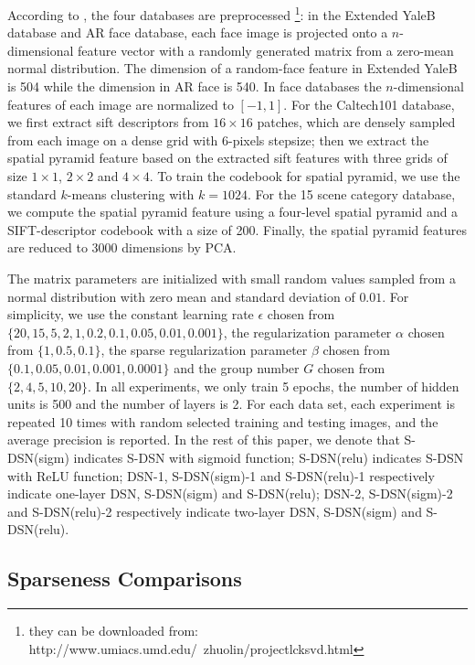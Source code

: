 \documentclass[letterpaper]{article}
\begin{document}
According to \cite{Jiang2013}, the four databases are preprocessed \footnote{they can be downloaded from: http://www.umiacs.umd.edu/~zhuolin/projectlcksvd.html}: in the Extended YaleB database and AR face database, each face image is projected onto a $n$-dimensional feature vector with a randomly generated matrix from a zero-mean normal distribution. The dimension of a random-face feature in Extended YaleB is 504 while the dimension in AR face is 540. In face databases the $n$-dimensional features of each image are normalized to $[-1,1]$. For the Caltech101 database, we first extract sift descriptors from $16\times16$ patches, which are densely sampled from each image on a dense grid with 6-pixels stepsize; then we extract the spatial pyramid feature based on the extracted sift features with three grids of size $1\times1$, $2\times2$ and $4\times4$. To train the codebook for spatial pyramid, we use the standard $k$-means clustering with $k = 1024$. For the 15 scene category database, we compute the spatial pyramid feature using a four-level spatial pyramid and a SIFT-descriptor codebook with a size of 200. Finally, the spatial pyramid features are reduced to 3000 dimensions by PCA.

The matrix parameters are initialized with small random values sampled from a normal distribution with zero mean and standard deviation of $0.01$. For simplicity, we use the constant learning rate $\epsilon$ chosen from $\{20, 15, 5, 2, 1, 0.2, 0.1, 0.05, 0.01, 0.001\}$, the regularization parameter $\alpha$ chosen from $\{1, 0.5, 0.1\}$, the sparse regularization parameter $\beta$ chosen from $\{0.1, 0.05, 0.01, 0.001, 0.0001\}$ and the group number $G$ chosen from $\{2, 4, 5, 10, 20\}$. In all experiments, we only train 5 epochs, the number of hidden units is 500 and the number of layers is 2. For each data set, each experiment is repeated 10 times with random selected training and testing images, and the average precision is reported.
In the rest of this paper, we denote that S-DSN(sigm) indicates S-DSN with sigmoid function; S-DSN(relu) indicates S-DSN with ReLU function; DSN-1, S-DSN(sigm)-1 and S-DSN(relu)-1 respectively indicate one-layer DSN, S-DSN(sigm) and S-DSN(relu); DSN-2, S-DSN(sigm)-2 and S-DSN(relu)-2 respectively indicate two-layer DSN, S-DSN(sigm) and S-DSN(relu).

\subsection{Sparseness Comparisons}
\label{sec:sparsecom}
\end{document}
